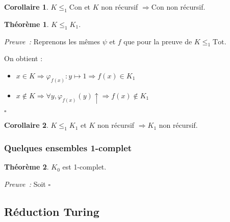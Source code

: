 \documentclass{book}
\theoremstyle{definition}
\newtheorem{theorem}{Théorème}
\newtheorem{corollary}{Corollaire}
\numberwithin{lemma}{subsection}
\numberwithin{theorem}{subsection}
\numberwithin{definition}{subsection}
\numberwithin{proposition}{subsection}
\numberwithin{corollary}{subsection}
\numberwithin{property}{subsection}
\numberwithin{example}{subsection}
\numberwithin{heuristique}{subsection}
\numberwithin{scenario}{subsection}
\newenvironment{proofi} {\noindent\emph{Preuve~:}} {\hfill $\square$\vspace{0.2cm}}
\newcommand{\GodelFunc}[1]{\varphi_{#1}}
\newcommand{\EnsTot}{\mathrm{Tot}}
\newcommand{\EnsCon}{\mathrm{Con}}
\begin{document}
            \begin{corollary}\label{cor:Con_non_rec}
                $K \leq_1 \EnsCon$ et $K$ non récursif $\Rightarrow \EnsCon$ non récursif.
            \end{corollary}
            
            \begin{theorem}
                $K \leq_1 K_1$.
            \end{theorem}
            
            \begin{proofi}
                Reprenons les mêmes $\psi$ et $f$ que pour la preuve de $K \leq_1 \EnsTot$.
                \par On obtient :
                \begin{itemize}
                    \item $x \in K \Rightarrow \GodelFunc{f(x)} : y \mapsto 1 \Rightarrow f(x) \in K_1$
                    \item $x \not\in K \Rightarrow \forall y, \GodelFunc{f(x)}(y)\uparrow \Rightarrow f(x) \not\in K_1$
                \end{itemize}
                \vspace{-\baselineskip}
            \end{proofi}
            
            \begin{corollary}\label{cor:K_1_non_rec}
                $K \leq_1 K_1$ et $K$ non récursif $\Rightarrow K_1$ non récursif.
            \end{corollary}
            
            \subsubsection{Quelques ensembles 1-complet}
            
            \begin{theorem}
                $K_0$ est 1-complet.
            \end{theorem}
            
            \begin{proofi}
                Soit 
            \end{proofi}
        
        \subsection{Réduction Turing}
        
\end{document}
